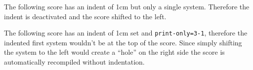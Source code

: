 \documentclass{scrartcl}
\begin{document}
\newcommand{\preLilyPondExample}{\par\bigskip\hrule\par\bigskip}

The following score has an indent of 1cm but only a single system. Therefore the
indent is deactivated and the score shifted to the left.


The following score has an indent of 1cm set and \texttt{print-only=3-1},
therefore the indented first system wouldn't be at the top of the score. Since
simply shifting the system to the left would create a “hole” on the right side
the score is automatically recompiled without indentation.

\end{document}
